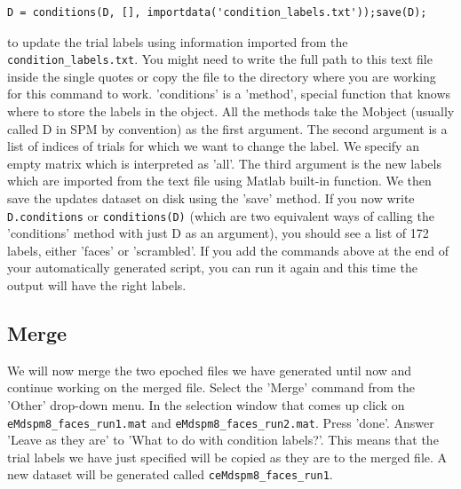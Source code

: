 \begin{verbatim}
D = conditions(D, [], importdata('condition_labels.txt'));save(D);
\end{verbatim}
to update the trial labels using information imported from the \texttt{condition_labels.txt}. You might need to write the full path to this text file inside the single quotes or copy the file to the directory where you are working for this command to work. 'conditions' is a 'method', special function that knows where to store the labels in the object. All the methods take the M\EEG object (usually called D in SPM by convention) as the first argument. The second argument is a list of indices of trials for which we want to change the label. We specify an empty matrix which is interpreted as 'all'. The third argument is the new labels which are imported from the text file using Matlab built-in function. We then save the updates dataset on disk using the 'save' method. If you now write \verb!D.conditions! or \verb!conditions(D)! (which are two equivalent ways of calling the 'conditions' method with just D as an argument), you should see a list of 172 labels, either 'faces' or 'scrambled'. If you add the commands above at the end of your automatically generated script, you can run it again and this time the output will have the right labels. 

\subsection{Merge}
We will now merge the two epoched files we have generated until now and continue working on the merged file. Select the 'Merge' command from the 'Other' drop-down menu. In the selection window that comes up click on \texttt{eMdspm8\_faces_run1.mat} and \texttt{eMdspm8\_faces_run2.mat}. Press 'done'. Answer 'Leave as they are' to 'What to do with condition labels?'. This means that the trial labels we have just specified will be copied as they are to the merged file. A new dataset will be generated called \texttt{ceMdspm8\_faces_run1}.

